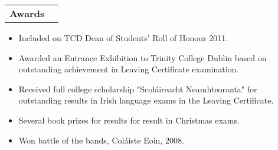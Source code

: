 \documentclass[11pt]{article}
\makeatletter
\newenvironment{resumeSubSectionHeader}{
    \par
    \begin{tabular*}{\textwidth}{l@{\extracolsep{\fill}}r}
    \par
} {
    \end{tabular*}
    \par
}
\newenvironment{resumeSubSectionBody}{
    \par
    \vspace{-0.8\parskip}
    \begin{small}
    \par
} {
    \par
    \end{small}
    \par
}
\makeatother
\begin{document}
\begin{resumeSubSectionHeader}
    \textbf{Awards}
\end{resumeSubSectionHeader}
\begin{resumeSubSectionBody}
    \begin{itemize}
        \item
            Included on TCD Dean of Students' Roll of Honour 2011.

        \item
            Awarded an Entrance Exhibition to Trinity College Dublin
            based on outstanding achievement in Leaving Certificate
            examination.

        \item
            Received full college scholarship "Scol\'aireacht Neamhteoranta"
            for outstanding results in Irish language exams in the
            Leaving Certificate.

        \item
            Several book prizes for results for result in Christmas exams.

        \item
            Won battle of the bands, Col\'aiste Eoin, 2008.
    \end{itemize}
\end{resumeSubSectionBody}
\end{document}
